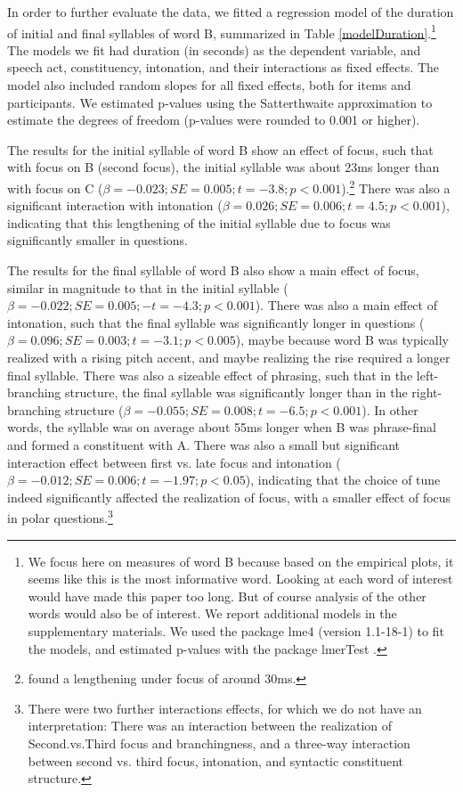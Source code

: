 \documentclass[preprint,review,12pt,authoryear,times]{elsarticle}
\begin{document}
In order to further evaluate the data, we fitted a regression model of the duration of initial and final syllables of word B, summarized in Table \ref{modelDuration}.\footnote{We focus here on measures of word B because based on the empirical plots, it seems like this is the most informative word. Looking at each word of interest would have made this paper too long. But of course analysis of the other words would also be of interest. We report additional models in the supplementary materials. We used the package lme4 (version 1.1-18-1) to fit the models, and estimated p-values with the package lmerTest \citep{kuzne13}.} The models we fit had duration (in seconds) as the dependent variable, and speech act, constituency, intonation, and their interactions as fixed effects. The model also included random slopes for all fixed effects, both for items and participants.  We estimated p-values using the Satterthwaite approximation to estimate the degrees of freedom \citep{kuzne13} (p-values were rounded to 0.001 or higher).



The results for the initial syllable of word B show an effect of focus, such that with focus on B (second focus), the initial syllable was about 23ms longer than with focus on C ($\beta=-0.023; SE=0.005; t=-3.8; p<0.001$).\footnote{\citet{eady86} found a lengthening under focus of around 30ms.}  There was also a significant interaction with intonation ($\beta=0.026; SE=0.006; t=4.5; p<0.001$), indicating that this lengthening of the initial syllable due to focus was significantly smaller in questions.  

The results for the final syllable of word B also show a main effect of focus, similar in magnitude to that in the initial syllable ($\beta=-0.022; SE=0.005;-   t=-4.3; p<0.001$). There was also a main effect of intonation, such that the final syllable was significantly longer in questions ($\beta=0.096; SE=0.003; t=-3.1; p<0.005$), maybe because word B was typically realized with a rising pitch accent, and maybe realizing the rise required a longer final syllable. There was also a sizeable effect of phrasing, such that in the left-branching structure, the final syllable was significantly longer than in the right-branching structure ($\beta=-0.055; SE=0.008; t=-6.5; p<0.001$). In other words, the syllable was on average about 55ms longer when B was phrase-final and formed a constituent with A. There was also a small but significant interaction effect between first vs. late focus and intonation ($\beta=-0.012; SE=0.006; t=-1.97; p<0.05$), indicating that the choice of tune indeed significantly affected the realization of focus, with a smaller effect of focus in polar questions.\footnote{There were two further interactions effects, for which we do not have an interpretation: There was an interaction between the realization of Second.vs.Third focus and branchingness, and a three-way interaction between second vs. third focus, intonation, and syntactic constituent structure.}
\end{document}

